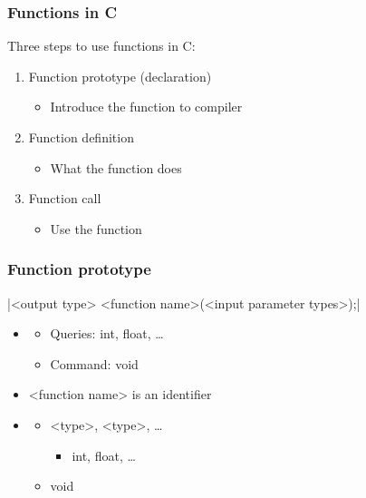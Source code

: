 \documentclass{../c-lecture}
\begin{document}
\begin{frame}
  \frametitle{Functions in C}
  Three steps to use functions in C:
  \begin{enumerate}
    \item Function prototype (declaration)
    \begin{itemize}
      \item Introduce the function to compiler
    \end{itemize}
    \item Function definition
    \begin{itemize}
      \item What the function does
    \end{itemize}
    \item Function call
    \begin{itemize}
      \item Use the function
    \end{itemize}
  \end{enumerate}
\end{frame}

\begin{frame}[fragile]
  \frametitle{Function \textbf{prototype}}
  |<output type> <function name>(<input parameter types>);|
  \begin{itemize}
    \item <output type>
    \begin{itemize}
      \item \textmd{\color{Orange} Queries}: int, float, \ldots
      \item \textmd{\color{LimeGreen} Command}: void
    \end{itemize}
    \item
      <function name> is an identifier
    \item <input parameter types>
    \begin{itemize}
      \item <type>, <type>, \ldots
      \begin{itemize}
        \item int, float, \ldots
      \end{itemize}
      \item void
    \end{itemize}
  \end{itemize}
\end{frame}
\end{document}
